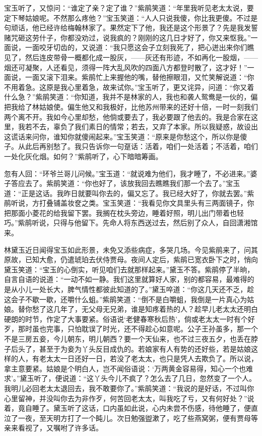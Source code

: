 宝玉听了，又惊问：``谁定了亲？定了谁？''紫鹃笑道：``年里我听见老太太说，要定下琴姑娘呢。不然那么疼他？''宝玉笑道：``人人只说我傻，你比我更傻。不过是句顽话，他已经许给梅翰林家了。果然定下了他，我还是这个形景了？先是我发誓赌咒砸这劳什子，你都没劝过，说我疯的？刚刚的这几日才好了，你又来怄我。''一面说，一面咬牙切齿的，又说道：``我只愿这会子立刻我死了，把心迸出来你们瞧见了，然后连皮带骨一概都化成一股灰，------灰还有形迹，不如再化一股烟，------烟还可凝聚，人还看见，须得一阵大乱风吹的四面八方都登时散了，这才好！''一面说，一面又滚下泪来。紫鹃忙上来握他的嘴，替他擦眼泪，又忙笑解说道：``你不用着急。这原是我心里着急，故来试你。''宝玉听了，更又诧异，问道：``你又着什么急？''紫鹃笑道：``你知道，我并不是林家的人，我也和袭人鸳鸯是一伙的，偏把我给了林姑娘使。偏生他又和我极好，比他苏州带来的还好十倍，一时一刻我们两个离不开。我如今心里却愁，他倘或要去了，我必要跟了他去的。我是合家在这里，我若不去，辜负了我们素日的情常；若去，又弃了本家。所以我疑惑，故设出这谎话来问你，谁知你就傻闹起来。''宝玉笑道：``原来是你愁这个，所以你是傻子。从此后再别愁了。我只告诉你一句趸话：活着，咱们一处活着；不活着，咱们一处化灰化烟。如何？''紫鹃听了，心下暗暗筹画。

忽有人回：``环爷兰哥儿问候。''宝玉道：``就说难为他们，我才睡了，不必进来。''婆子答应去了。紫鹃笑道：``你也好了，该放我回去瞧瞧我们那一个去了。''宝玉道：``正是这话。我昨日就要叫你去的，偏又忘了。我已经大好了，你就去罢。''紫鹃听说，方打叠铺盖妆奁之类。宝玉笑道：``我看见你文具里头有三两面镜子，你把那面小菱花的给我留下罢。我搁在枕头旁边，睡着好照，明儿出门带着也轻巧。''紫鹃听说，只得与他留下。先命人将东西送过去，然后别了众人，自回潇湘馆来。

林黛玉近日闻得宝玉如此形景，未免又添些病症，多哭几场。今见紫鹃来了，问其原故，已知大愈，仍遣琥珀去伏侍贾母。夜间人定后，紫鹃已宽衣卧下之时，悄向黛玉笑道：``宝玉的心倒实，听见咱们去就那样起来。''黛玉不答。紫鹃停了半晌，自言自语的说道：``一动不如一静。我们这里就算好人家，别的都容易，最难得的是从小儿一处长大，脾气情性都彼此知道的了。''黛玉啐道：``你这几天还不乏，趁这会子不歇一歇，还嚼什么蛆。''紫鹃笑道：``倒不是白嚼蛆，我倒是一片真心为姑娘。替你愁了这几年了，无父母无兄弟，谁是知疼着热的人？趁早儿老太太还明白硬朗的时节，作定了大事要紧。俗语说`老健春寒秋后热'，倘或老太太一时有个好歹，那时虽也完事，只怕耽误了时光，还不得趁心如意呢。公子王孙虽多，那一个不是三房五妾，今儿朝东，明儿朝西？要一个天仙来，也不过三夜五夕，也丢在脖子后头了，甚至于为妾为丫头反目成仇的。若娘家有人有势的还好些，若是姑娘这样的人，有老太太一日还好一日，若没了老太太，也只是凭人去欺负了。所以说，拿主意要紧。姑娘是个明白人，岂不闻俗语说：`万两黄金容易得，知心一个也难求'。''黛玉听了，便说道：``这丫头今儿不疯了？怎么去了几日，忽然变了一个人。我明儿必回老太太退回去，我不敢要你了。''紫鹃笑道：``我说的是好话，不过叫你心里留神，并没叫你去为非作歹，何苦回老太太，叫我吃了亏，又有何好处？''说着，竟自睡了。黛玉听了这话，口内虽如此说，心内未尝不伤感，待他睡了，便直泣了一夜，至天明方打了一个盹儿。次日勉强盥漱了，吃了些燕窝粥，便有贾母等亲来看视了，又嘱咐了许多话。

